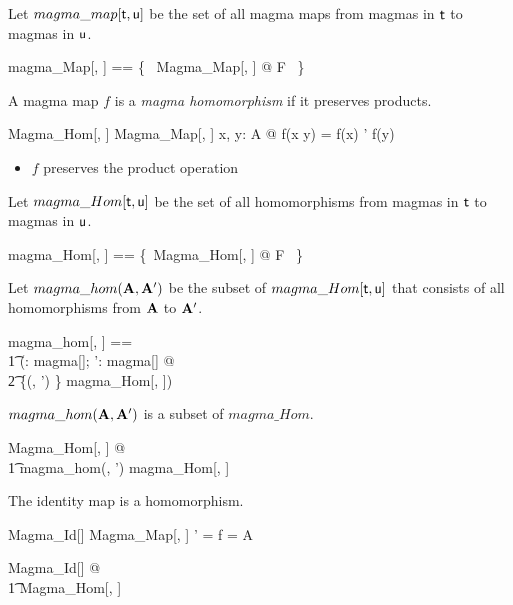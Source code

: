 \documentclass{amsart}
\begin{document}
Let $magma\_map[\mathsf{t}, \mathsf{u}]$ be the set of all magma maps
from magmas in $\mathsf{t}$ to magmas in $\mathsf{u}$.

\begin{zed}
	magma\_Map[\genT, \genU] == \{~ Magma\_Map[\genT, \genU] @ F ~\}
\end{zed}

A magma map $f$ is a \textit{magma homomorphism} if it preserves products.

\begin{schema}{Magma\_Hom}[\genT, \genU]
	Magma\_Map[\genT, \genU]
\where
	\forall x, y: A @ f(x \opG y) = f(x) \opG' f(y)
\end{schema}

\begin{itemize}
	\item $f$ preserves the product operation
\end{itemize}

Let $magma\_Hom[\mathsf{t}, \mathsf{u}]$ be the set of all homomorphisms
from magmas in $\mathsf{t}$ to magmas in $\mathsf{u}$.

\begin{zed}
	magma\_Hom[\genT, \genU] == \{~Magma\_Hom[\genT, \genU] @ F ~\}
\end{zed}

Let $magma\_hom(\mathbf{A}, \mathbf{A}')$ be the subset of $magma\_Hom[\mathsf{t}, \mathsf{u}]$ 
that consists of all homomorphisms from $\mathbf{A}$ to $\mathbf{A}'$.

\begin{zed}
	magma\_hom[\genT, \genU] == \\
	\t1	(\lambda \strucA: magma[\genT]; \strucA': magma[\genU] @ \\
	\t2		\{(\strucA, \strucA') \} \dres magma\_Hom[\genT, \genU])
\end{zed}

\begin{remark} $magma\_hom(\mathbf{A}, \mathbf{A}')$ is a subset of $magma\_Hom$.

\begin{zed}
	\forall Magma\_Hom[\setT, \setU] @ \\
	\t1	magma\_hom(\strucA, \strucA') \subseteq magma\_Hom[\setT, \setU]
\end{zed}

\end{remark}

\begin{example}

The identity map is a homomorphism.

\begin{schema}{Magma\_Id}[\genT]
	Magma\_Map[\genT, \genT]
\where
	\strucA' = \strucA
\also
	f = \id A
\end{schema}

\begin{zed}
	\forall Magma\_Id[\setT] @ \\
	\t1	Magma\_Hom[\setT, \setT]
\end{zed}

\end{example}
\end{document}
